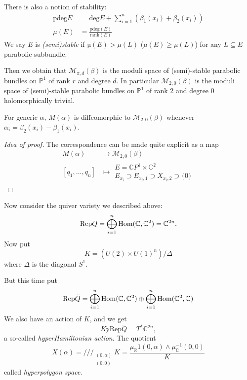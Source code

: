 {There is also a notion of stability:
\begin{align*}
\text{pdeg}E&=\text{deg}E+ \sum_{i=1}^n (\beta_1(x_i)+\beta_2(x_i))\\
\mu(E)&=\frac{\text{pdeg}(E)}{\text{rank}(E)}
\end{align*}
We say $E$ is {\it (semi)stable} if
$µ(E)> \mu(L)$ ($\mu(E) \geq \mu(L)$)
for any $L \subseteq E$ parabolic
subbundle.

Then we obtain that $\mathcal{M}_{\pi,d}(\beta)$
is the moduli space of (semi)-stable
parabolic bundles on $\mathbb{P}^1$ 
of rank $r$ and degree $d$.
In particular $\mathcal{M}_{2,0}(\beta)$
is the moduli space of (semi)-stable parabolic
bundles on $\mathbb{P}^1$ of rank 2 and degree 0
holomorphically trivial.

\begin{theorem}
\label{theorem-Jeffrey-Godinho}
For generic $ \alpha$,
$M(\alpha)$ is diffeomorphic to
$\mathcal{M}_{2,0}(\beta)$ 
whenever $\alpha_i=\beta_2(x_i)-\beta_1(x_i)$.
\end{theorem}

\begin{proof}[Idea of proof]
The correspondence can be made quite explicit
as a map
\begin{align*}
M(\alpha) &\longrightarrow \mathcal{M}_{2,0}(\beta) \\
[q_1,\ldots,q_n] &\longmapsto \substack{E=\mathbb{C}P^{1}\times\mathbb{C}^2
 \\ E_{x_i}\supset E_{x_i,1}\supset X_{x_i,2}\supset \{0\}}\end{align*}

\end{proof}

\medskip\noindent
Now consider the quiver variety we described above:
$$
\text{Rep}Q=\bigoplus_{i=1}^n \mathop{\mathrm{Hom}}\nolimits(\mathbb{C},\mathbb{C}^2)=\mathbb{C}^{2n}.
$$
Now put
$$
K=(U(2) \times U(1)^n)/\Delta
$$
where $\Delta$ is the diagonal $S^1$.

But this time put
$$
\text{Rep}\tilde{Q}=\bigoplus_{i=1}^n \mathop{\mathrm{Hom}}\nolimits(\mathbb{C},\mathbb{C}^2)
\oplus \bigoplus_{i=1}^n \mathop{\mathrm{Hom}}\nolimits(\mathbb{C}^2,\mathbb{C})
$$
We also have an action of $K$, and we get
$$
K \mathbb{y} \text{Rep}\tilde{Q} = T^*  \mathbb{C}^{2n},
$$
a so-called {\it hyperHamiltonian action}.
The quotient
$$
X(\alpha)=/\!/\!/_{\substack{(0,\alpha) \\ (0,0)}}K=
\frac{\mu_{\mathbb{R}}1(0,\alpha) \wedge \mu^{-1}_{\mathbb{C}}(0,0)}{K}
$$
called {\it hyperpolygon space}.

}
